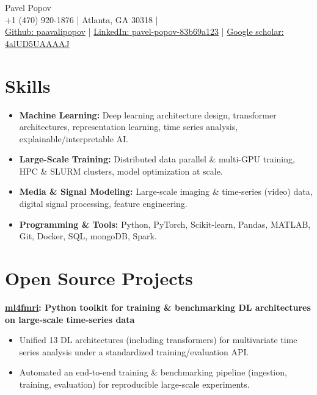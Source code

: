 \documentclass[11pt,a4paper]{article}
\begin{document}
\begin{center}
  {\Huge Pavel Popov}\\[0.5em]
  {\footnotesize +1 (470) 920-1876 \quad | \quad Atlanta, GA 30318} \quad | \\
  {\small \href{https://github.com/paavalipopov}{Github: paavalipopov} \quad | \quad
  \href{https://www.linkedin.com/in/pavel-popov-83b69a123/}{LinkedIn: pavel-popov-83b69a123} \quad | \quad
  \href{https://scholar.google.com/citations?user=4alUD5UAAAAJ}{Google scholar: 4alUD5UAAAAJ}}
\end{center}

\section*{Skills}
\begin{itemize}
[leftmargin=*,noitemsep]
\item \textbf{Machine Learning:} Deep learning architecture design, transformer architectures, representation learning, time series analysis, explainable/interpretable AI.
\item \textbf{Large-Scale Training:} Distributed data parallel \& multi-GPU training, HPC \& SLURM clusters, model optimization at scale.
\item \textbf{Media \& Signal Modeling:} Large-scale imaging \& time-series (video) data, digital signal processing, feature engineering.
\item \textbf{Programming \& Tools:} Python, PyTorch, Scikit-learn, Pandas, MATLAB, Git, Docker, SQL, mongoDB, Spark.
\end{itemize}
\vspace{-18pt}
\section*{Open Source Projects}
\noindent\textbf{\href{https://pypi.org/project/ml4fmri/}{ml4fmri}: Python toolkit for training \& benchmarking DL architectures on large-scale time-series data}\\
[-2em]
\begin{itemize}[leftmargin=*,noitemsep]
    \item Unified 13 DL architectures (including transformers) for multivariate time series analysis under a standardized training/evaluation API.
    \item Automated an end-to-end training \& benchmarking pipeline (ingestion, training, evaluation) for reproducible large-scale experiments.
\end{itemize}
\end{document}
